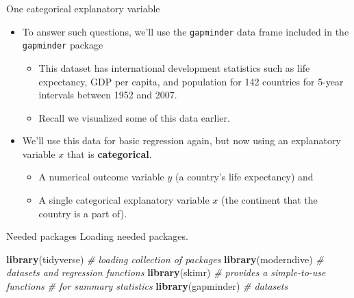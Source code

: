 \documentclass[
  ignorenonframetext,
]{beamer}
\newenvironment{Shaded}{\begin{snugshade}}{\end{snugshade}}
\newcommand{\CommentTok}[1]{\textcolor[rgb]{0.56,0.35,0.01}{\textit{#1}}}
\newcommand{\FunctionTok}[1]{\textcolor[rgb]{0.13,0.29,0.53}{\textbf{#1}}}
\newcommand{\NormalTok}[1]{#1}
\providecommand{\tightlist}{%
  \setlength{\itemsep}{0pt}\setlength{\parskip}{0pt}}
\begin{document}
\begin{frame}[fragile]{One categorical explanatory variable}
\label{one-categorical-explanatory-variable-2}
\begin{itemize}
\item
  To answer such questions, we'll use the \texttt{gapminder} data frame
  included in the \texttt{gapminder} package

  \begin{itemize}
  \item
    This dataset has international development statistics such as life
    expectancy, GDP per capita, and population for 142 countries for
    5-year intervals between 1952 and 2007.
  \item
    Recall we visualized some of this data earlier.
  \end{itemize}
\item
  We'll use this data for basic regression again, but now using an
  explanatory variable \(x\) that is \textbf{categorical}.

  \begin{itemize}
  \tightlist
  \item
    A numerical outcome variable \(y\) (a country's life expectancy) and
  \item
    A single categorical explanatory variable \(x\) (the continent that
    the country is a part of).
  \end{itemize}
\end{itemize}
\end{frame}

\begin{frame}[fragile]{Needed packages}
\label{needed-packages}
Loading needed packages.

\begin{Shaded}
\begin{Highlighting}[]
\FunctionTok{library}\NormalTok{(tidyverse)   }\CommentTok{\# loading collection of packages}
\FunctionTok{library}\NormalTok{(moderndive)  }\CommentTok{\# datasets and regression functions}
\FunctionTok{library}\NormalTok{(skimr)       }\CommentTok{\# provides a simple{-}to{-}use functions }
                     \CommentTok{\# for summary statistics}
\FunctionTok{library}\NormalTok{(gapminder)   }\CommentTok{\# datasets}
\end{Highlighting}
\end{Shaded}
\end{frame}
\end{document}
